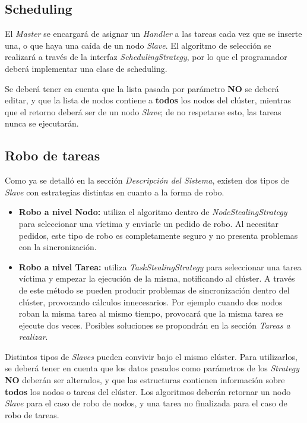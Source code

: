 \documentclass[12pt,a4paper,oneside,spanish]{report}
\begin{document}
\subsection*{Scheduling}

El \textit{Master} se encargará de asignar un \textit{Handler} a las tareas cada vez que se inserte una, o que haya una caída de un nodo \textit{Slave}. El algoritmo de selección se realizará a través de la interfaz \textit{SchedulingStrategy}, por lo que el programador deberá implementar una clase de scheduling.

Se deberá tener en cuenta que la lista pasada por parámetro \textbf{NO} se deberá editar, y que la lista de nodos contiene a \textbf{todos} los nodos del clúster, mientras que el retorno deberá ser de un nodo \textit{Slave}; de no respetarse esto, las tareas nunca se ejecutarán.

\subsection*{Robo de tareas}

Como ya se detalló en la sección \textit{Descripción del Sistema}, existen dos tipos de \textit{Slave} con estrategias distintas en cuanto a la forma de robo.

\begin{itemize}
	\item \textbf{Robo a nivel Nodo:} utiliza el algoritmo dentro de \textit{NodeStealingStrategy} para seleccionar una víctima y enviarle un pedido de robo. Al necesitar pedidos, este tipo de robo es completamente seguro y no presenta problemas con la sincronización.
	\item \textbf{Robo a nivel Tarea:} utiliza \textit{TaskStealingStrategy} para seleccionar una tarea víctima y empezar la ejecución de la misma, notificando al clúster. A través de este método se pueden producir problemas de sincronización dentro del clúster, provocando cálculos innecesarios. Por ejemplo cuando dos nodos roban la misma tarea al mismo tiempo, provocará que la misma tarea se ejecute dos veces. Posibles soluciones se propondrán en la sección \textit{Tareas a realizar}.
\end{itemize}

Distintos tipos de \textit{Slaves} pueden convivir bajo el mismo clúster. Para utilizarlos, se deberá tener en cuenta que los datos pasados como parámetros de los \textit{Strategy} \textbf{NO} deberán ser alterados, y que las estructuras contienen información sobre \textbf{todos} los nodos o tareas del clúster. Los algoritmos deberán retornar un nodo \textit{Slave} para el caso de robo de nodos, y una tarea no finalizada para el caso de robo de tareas.
\end{document}

